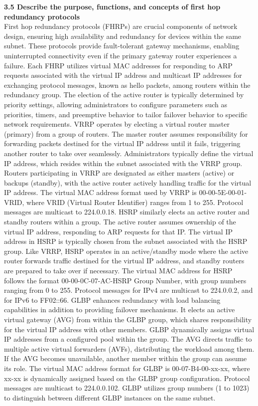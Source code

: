\documentclass{article}
\begin{document}
\textbf{3.5 Describe the purpose, functions, and concepts of first hop redundancy protocols}\\

	First hop redundancy protocols (FHRPs) are crucial components of network design, ensuring high availability and redundancy for devices within the same subnet. These protocols provide fault-tolerant gateway mechanisms, enabling uninterrupted connectivity even if the primary gateway router experiences a failure. Each FHRP utilizes virtual MAC addresses for responding to ARP requests associated with the virtual IP address and multicast IP addresses for exchanging protocol messages, known as hello packets, among routers within the redundancy group. The election of the active router is typically determined by priority settings, allowing administrators to configure parameters such as priorities, timers, and preemptive behavior to tailor failover behavior to specific network requirements. VRRP operates by electing a virtual router master (primary) from a group of routers. The master router assumes responsibility for forwarding packets destined for the virtual IP address until it fails, triggering another router to take over seamlessly. Administrators typically define the virtual IP address, which resides within the subnet associated with the VRRP group. Routers participating in VRRP are designated as either masters (active) or backups (standby), with the active router actively handling traffic for the virtual IP address. The virtual MAC address format used by VRRP is 00-00-5E-00-01-{VRID}, where VRID (Virtual Router Identifier) ranges from 1 to 255. Protocol messages are multicast to 224.0.0.18. HSRP similarly elects an active router and standby routers within a group. The active router assumes ownership of the virtual IP address, responding to ARP requests for that IP. The virtual IP address in HSRP is typically chosen from the subnet associated with the HSRP group. Like VRRP, HSRP operates in an active/standby mode where the active router forwards traffic destined for the virtual IP address, and standby routers are prepared to take over if necessary. The virtual MAC address for HSRP follows the format 00-00-0C-07-AC-{HSRP Group Number}, with group numbers ranging from 0 to 255. Protocol messages for IPv4 are multicast to 224.0.0.2, and for IPv6 to FF02::66. GLBP enhances redundancy with load balancing capabilities in addition to providing failover mechanisms. It elects an active virtual gateway (AVG) from within the GLBP group, which shares responsibility for the virtual IP address with other members. GLBP dynamically assigns virtual IP addresses from a configured pool within the group. The AVG directs traffic to multiple active virtual forwarders (AVFs), distributing the workload among them. If the AVG becomes unavailable, another member within the group can assume its role. The virtual MAC address format for GLBP is 00-07-B4-00-xx-xx, where xx-xx is dynamically assigned based on the GLBP group configuration. Protocol messages are multicast to 224.0.0.102. GLBP utilizes group numbers (1 to 1023) to distinguish between different GLBP instances on the same subnet.
\end{document}
